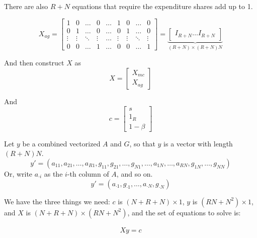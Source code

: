 \documentclass[11pt]{article}
\begin{document}
There are also $R+N$ equations that require the expenditure shares add up to 1.

\[
X_{ag} = 
\begin{bmatrix}
    1 & 0 &\dots  & 0 & \dots & 1 & 0 & \dots & 0\\
    0 & 1 &\dots  & 0 & \dots & 0 & 1 &\dots  & 0\\
    \vdots & \vdots & \ddots & \vdots & \dots & \vdots & \vdots & \ddots & \vdots \\
    0 & 0 & \dots  & 1 & \dots & 0 & 0 &\dots  & 1
\end{bmatrix} = 
\underbrace{\begin{bmatrix}
I_{R+N} \ldots I_{R+N}
\end{bmatrix}}_{(R+N) \times (R+N) N}
\]



And then construct $X$ as
\[
X = 
\begin{bmatrix}
X_{mc} \\
X_{ag}
\end{bmatrix}
\]

And 
\[
c = 
\begin{bmatrix}
s \\
1_R \\
1-\beta
\end{bmatrix}
\]

Let $y$ be a combined vectorized $A$ and $G$, so that $y$ is a vector with length $(R + N) N$. 
\[ 
y' = (a_{11},a_{21},\ldots,a_{R1},g_{11},g_{21},\ldots,g_{N1},\ldots,a_{1N},\ldots,a_{RN},g_{1N},\ldots,g_{NN}) 
\]
Or, write $a_{\cdot i}$ as the $i$-th column of $A$, and so on.
\[ 
y' = (a_{\cdot 1},g_{ \cdot 1},\ldots,a_{ \cdot N},g_{ \cdot N})
\]

We have the three things we need: $c$ is $(N + R + N) \times 1$, $y$ is $(RN + N^2)\times 1$, and $X$ is $(N+R+N)\times (RN + N^2)$, and the set of equations to solve is:

\begin{gather}
X y = c
\end{gather}
\end{document}
